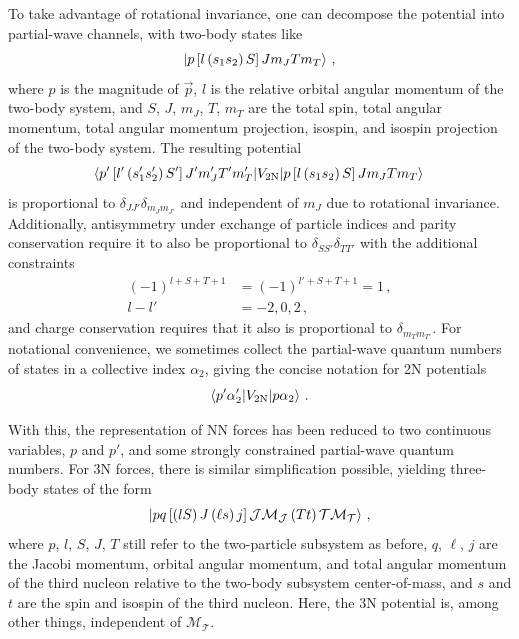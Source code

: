 To take advantage of rotational invariance, one can decompose the potential into partial-wave channels,
with two-body states like
\begin{equation}
  \ket{p \left[l \left(s_1 s_2 \right) S \right] J m_{J} T m_{T}}\,,
\end{equation}
where $p$ is the magnitude of $\vec{p}$,
$l$ is the relative orbital angular momentum of the two-body system,
and $S$, $J$, $m_J$, $T$, $m_{T}$ are the
total spin, total angular momentum, total angular momentum projection, isospin, and isospin projection
of the two-body system.
The resulting potential
\begin{equation}
  \braket{p' \left[l' \left(s_{1}^{\prime} s_{2}^{\prime} \right) S' \right] J' m_{J}^{\prime} T' m_{T}^{\prime}
    | V_{2\text{N}} |
    p \left[l \left(s_{1} s_{2} \right) S \right] J m_{J} T m_{T}
  }\,
\end{equation}
is proportional to $\delta_{JJ'}\delta_{m_J m_{J'}}$ and independent of $m_J$ due to rotational invariance.
Additionally, antisymmetry under exchange of particle indices and parity conservation require
it to also be proportional to $\delta_{S S'} \delta_{T T'}$ with the additional constraints
\begin{align}
  {(-1)}^{l + S + T + 1} & = {(-1)}^{l' + S + T + 1} = 1\,, \\
  l - l'                 & = -2, 0, 2\,,
\end{align}
and charge conservation requires that it also is proportional to $\delta_{m_T m_{T'}}$.
For notational convenience, we sometimes collect the partial-wave quantum numbers of states
in a collective index $\alpha_2$,
giving the concise notation for 2N potentials
\begin{equation}
  \braket{p' \alpha_{2}^{\prime}|V_{2\text{N}}| p \alpha_2}\,.
\end{equation}

With this, the representation of NN forces has been reduced to two continuous variables, $p$ and $p'$,
and some strongly constrained partial-wave quantum numbers.
For 3N forces, there is similar simplification possible, yielding three-body states of the form
\begin{equation}
  \ket{p q \left[\left(l S\right) J \left(\ell s\right) j\right] \mathcal{J} \mathcal{M}_{\mathcal{J}} \left(T t\right) \mathcal{T} \mathcal{M}_{\mathcal{T}}}\,,
\end{equation}
where $p$, $l$, $S$, $J$, $T$ still refer to the two-particle subsystem as before,
$q$, $\ell$, $j$ are the Jacobi momentum, orbital angular momentum, and total angular momentum of the third nucleon
relative to the two-body subsystem center-of-mass,
and $s$ and $t$ are the spin and isospin of the third nucleon.
Here, the 3N potential is, among other things, independent of $\mathcal{M}_{\mathcal{T}}$.

